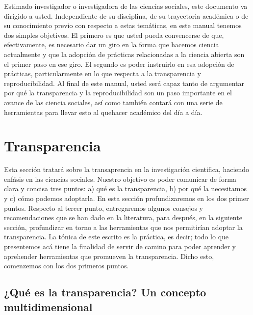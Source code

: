 \documentclass[
]{book}
\begin{document}
Estimado investigador o investigadora de las ciencias sociales, este documento va dirigido a usted. Independiente de su disciplina, de su trayectoria académica o de su conocimiento previo con respecto a estas temáticas, en este manual tenemos dos simples objetivos. El primero es que usted pueda convencerse de que, efectivamente, es necesario dar un giro en la forma que hacemos ciencia actualmente y que la adopción de prácticas relacionadas a la ciencia abierta son el primer paso en ese giro. El segundo es poder instruirlo en esa adopción de prácticas, particularmente en lo que respecta a la transparencia y reproducibilidad. Al final de este manual, usted será capaz tanto de argumentar por qué la transparencia y la reproducibilidad son un paso importante en el avance de las ciencia sociales, así como también contará con una serie de herramientas para llevar esto al quehacer académico del día a día.

\hypertarget{transparencia}{%
\chapter{Transparencia}\label{transparencia}}

Esta sección tratará sobre la transaprencia en la investigación cientifica, haciendo enfásis en las ciencias sociales. Nuestro objetivo es poder comunicar de forma clara y concisa tres puntos: a) qué es la transparencia, b) por qué la necesitamos y c) cómo podemos adoptarla. En esta sección profundizaremos en los dos primer puntos. Respecto al tercer punto, entregaremos algunos consejos y recomendaciones que se han dado en la literatura, para después, en la siguiente sección, profundizar en torno a las herramientas que nos permitirían adoptar la transparencia. La tónica de este escrito es la práctica, es decir; todo lo que presentemos acá tiene la finalidad de servir de camino para poder aprender y aprehender herramientas que promueven la transparencia. Dicho esto, comenzemos con los dos primeros puntos.

\hypertarget{quuxe9-es-la-transparencia-un-concepto-multidimensional}{%
\section{¿Qué es la transparencia? Un concepto multidimensional}\label{quuxe9-es-la-transparencia-un-concepto-multidimensional}}
\end{document}
